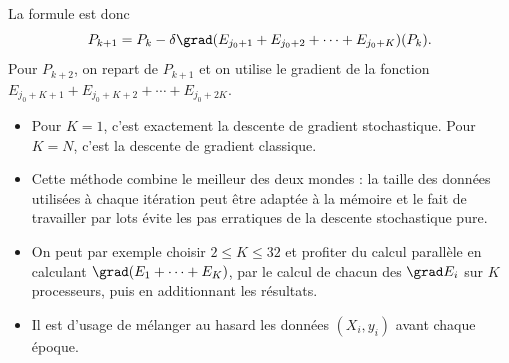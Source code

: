 \documentclass[11pt,class=report,crop=false]{standalone}
\begin{document}
La formule est donc
$$P_{k+1} = P_k - \delta \grad (E_{j_0+1}+E_{j_0+2}+\cdots+E_{j_0+K}) (P_k).$$
Pour $P_{k+2}$, on repart de $P_{k+1}$ et on utilise le gradient de la fonction $E_{j_0+K+1}+E_{j_0+K+2}+\cdots+E_{j_0+2K}$.


\begin{remarque*}
\sauteligne
\begin{itemize}
  \item Pour $K=1$, c'est exactement la descente de gradient stochastique. Pour $K=N$, c'est la descente de gradient classique.
  
  \item Cette méthode combine le meilleur des deux mondes : la taille des données utilisées à chaque itération peut être adaptée à la mémoire et le fait de travailler par lots évite les pas erratiques de la descente stochastique pure.
  
  \item On peut par exemple choisir $2 \le K \le 32$ et profiter du calcul parallèle en calculant $\grad (E_1+\cdots + E_K)$, par le calcul de chacun des $\grad E_i$ sur $K$ processeurs, puis en additionnant les résultats.
  
  \item Il est d'usage de mélanger au hasard les données $(X_i,y_i)$ avant chaque époque.
\end{itemize}
\end{remarque*}
\end{document}
